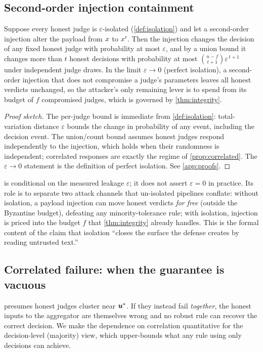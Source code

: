 \subsection{Second-order injection containment}
\begin{proposition}
\label{prop:isolation}
Suppose every honest judge is $\varepsilon$-isolated (\cref{def:isolation}) and let a
second-order injection alter the payload from $x$ to $x'$. Then the injection changes
the decision of any fixed honest judge with probability at most $\varepsilon$, and by a
union bound it changes more than $t$ honest decisions with probability at most
$\binom{n-f}{t+1}\varepsilon^{\,t+1}$ under independent judge draws. In the limit
$\varepsilon\to 0$ (perfect isolation), a second-order injection that does not compromise a
judge's parameters leaves all honest verdicts unchanged, so the attacker's only remaining
lever is to spend from its budget of $f$ compromised judges, which is governed by
\cref{thm:integrity}.
\end{proposition}
\begin{proof}[Proof sketch]
The per-judge bound is immediate from \cref{def:isolation}: total-variation distance
$\varepsilon$ bounds the change in probability of any event, including the decision event.
The union/count bound assumes honest judges respond independently to the injection, which
holds when their randomness is independent; correlated responses are exactly the regime of
\cref{prop:correlated}. The $\varepsilon\to0$ statement is the definition of perfect
isolation. See \cref{app:proofs}.
\end{proof}
\begin{remark}
 is conditional on the measured leakage $\varepsilon$; it does not
assert $\varepsilon=0$ in practice. Its role is to separate two attack channels that
un-isolated pipelines conflate: without isolation, a payload injection can move honest
verdicts \emph{for free} (outside the Byzantine budget), defeating any minority-tolerance
rule; with isolation, injection is priced into the budget $f$ that
\cref{thm:integrity} already handles. This is the formal content of the claim that
isolation ``closes the surface the defense creates by reading untrusted text.''
\end{remark}

\subsection{Correlated failure: when the guarantee is vacuous}
 presumes honest judges cluster near $\bm{u}^{\star}$. If they instead
fail \emph{together}, the honest inputs to the aggregator are themselves wrong and no
robust rule can recover the correct decision. We make the dependence on correlation
quantitative for the decision-level (majority) view, which upper-bounds what any rule
using only decisions can achieve.

